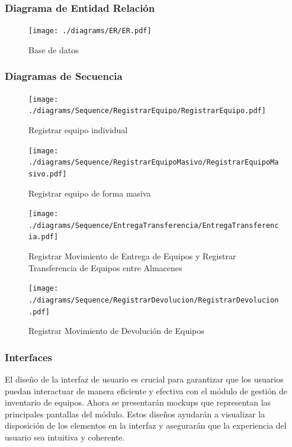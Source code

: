 \documentclass[stu, 12pt, letterpaper, donotrepeattitle, floatsintext, natbib]{apa7}
\begin{document}
\subsubsection{Diagrama de Entidad Relaci\'on}
\begin{figure}[H]
    \centering
    \caption{Base de datos}
    \texttt{[image: ./diagrams/ER/ER.pdf]}
\end{figure}
\subsubsection{Diagramas de Secuencia}
\begin{figure}[H]
    \centering
    \caption{Registrar equipo individual}
    \texttt{[image: ./diagrams/Sequence/RegistrarEquipo/RegistrarEquipo.pdf]}
\end{figure}
\begin{figure}[H]
    \centering
    \caption{Registrar equipo de forma masiva}
    \texttt{[image: ./diagrams/Sequence/RegistrarEquipoMasivo/RegistrarEquipoMasivo.pdf]}
\end{figure}
\begin{figure}[H]
    \centering
    \caption{Registrar Movimiento de Entrega de Equipos y Registrar Transferencia de Equipos entre Almacenes}
    \texttt{[image: ./diagrams/Sequence/EntregaTransferencia/EntregaTransferencia.pdf]}
\end{figure}
\begin{figure}[H]
    \centering
    \caption{Registrar Movimiento de Devoluci\'on de Equipos}
    \texttt{[image: ./diagrams/Sequence/RegistrarDevolucion/RegistrarDevolucion.pdf]}
\end{figure}
\subsubsection{Interfaces}
El dise\~{n}o de la interfaz de usuario es crucial para garantizar que los usuarios puedan interactuar de manera eficiente y efectiva con el m\'odulo de gesti\'on de inventario de equipos. Ahora se presentar\'an mockups que representan las principales pantallas del m\'odulo. Estos dise\~{n}os ayudar\'an a visualizar la disposici\'on de los elementos en la interfaz y asegurar\'an que la experiencia del usuario sea intuitiva y coherente.
\end{document}
